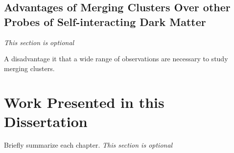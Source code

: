 \subsection{Advantages of Merging Clusters Over other Probes of Self-interacting Dark Matter}

\textit{This section is optional}

A disadvantage it that a wide range of observations are necessary to study merging clusters.

\section{Work Presented in this Dissertation}
Briefly summarize each chapter. \textit{This section is optional}